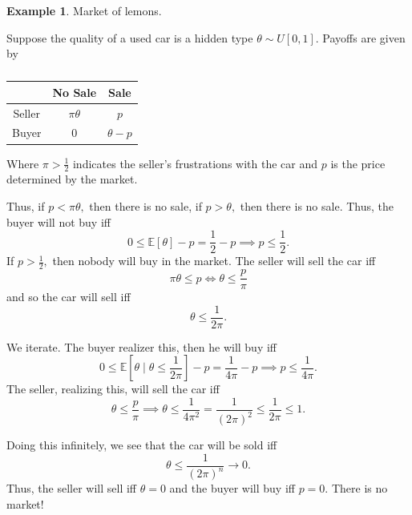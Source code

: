 \documentclass[10pt, oneside]{article}
\newcommand{\bbE}{\mathbb{E}}
\theoremstyle{definition}
\newtheorem{exmp}{Example}[section]
\begin{document}
\begin{exmp}
    Market of lemons. 

Suppose the quality of a used car is a hidden type $\theta \sim U[0,1].$ Payoffs are given by 
    \begin{table}[H]
            \centering
        \begin{tabular}{c|c|c}
             & No Sale & Sale\\
             \hline
             Seller & $\pi \theta$ & $p$ \\
             \hline
             Buyer &  $0$& $\theta - p$\\
        \end{tabular}
        \caption{}
    \end{table}
    Where $\pi > \frac{1}{2}$ indicates the seller's frustrations with the car and $p$ is the price determined by the market.

    Thus, if $p < \pi \theta,$ then there is no sale, if $p >\theta,$ then there is no sale. Thus, the buyer will not buy iff 
    \[0 \leq \bbE[\theta] - p = \frac{1}{2} - p \implies p\leq \frac{1}{2}.\] If $p> \frac{1}{2},$ then nobody will buy in the market. The seller will sell the car iff \[\pi \theta \leq p \iff \theta \leq \frac{p}{\pi}\] and so the car will sell iff \[ \theta \leq \frac{1}{2\pi}.\]

    We iterate. The buyer realizer this, then he will buy iff 
    \[0 \leq \bbE[\theta \mid \theta \leq \frac{1}{2\pi}] - p = \frac{1}{4\pi}  -p \implies p \leq \frac{1}{4\pi}.\] The seller, realizing this, will sell the car iff 
    \[\theta \leq \frac{p}{\pi}\implies \theta \leq \frac{1}{4\pi^2} = \frac{1}{(2\pi)^2} \leq \frac{1}{2\pi} \leq 1.\]

    Doing this infinitely, we see that the car will be sold iff 
    \[\theta \leq \frac{1}{(2\pi)^n}\to 0.\] Thus, the seller will sell iff $\theta = 0$ and the buyer will buy iff $p = 0.$ There is no market!
\end{exmp}


\newpage
\end{document}
